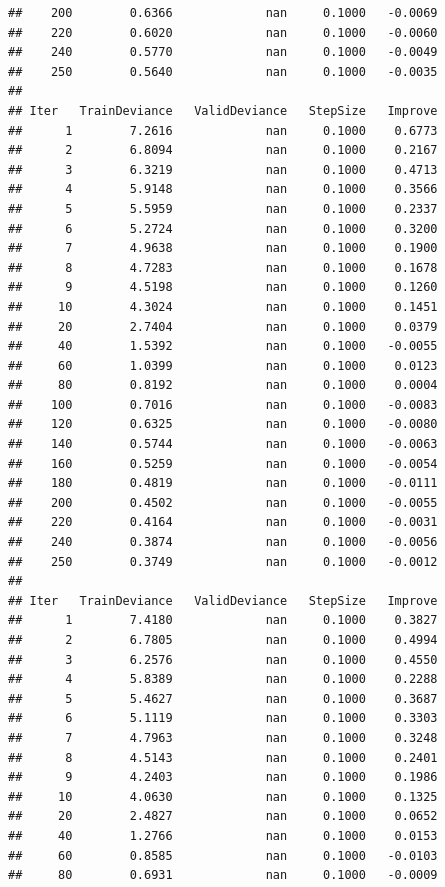 \documentclass[
]{book}
\begin{document}
\begin{verbatim}
##    200        0.6366             nan     0.1000   -0.0069
##    220        0.6020             nan     0.1000   -0.0060
##    240        0.5770             nan     0.1000   -0.0049
##    250        0.5640             nan     0.1000   -0.0035
## 
## Iter   TrainDeviance   ValidDeviance   StepSize   Improve
##      1        7.2616             nan     0.1000    0.6773
##      2        6.8094             nan     0.1000    0.2167
##      3        6.3219             nan     0.1000    0.4713
##      4        5.9148             nan     0.1000    0.3566
##      5        5.5959             nan     0.1000    0.2337
##      6        5.2724             nan     0.1000    0.3200
##      7        4.9638             nan     0.1000    0.1900
##      8        4.7283             nan     0.1000    0.1678
##      9        4.5198             nan     0.1000    0.1260
##     10        4.3024             nan     0.1000    0.1451
##     20        2.7404             nan     0.1000    0.0379
##     40        1.5392             nan     0.1000   -0.0055
##     60        1.0399             nan     0.1000    0.0123
##     80        0.8192             nan     0.1000    0.0004
##    100        0.7016             nan     0.1000   -0.0083
##    120        0.6325             nan     0.1000   -0.0080
##    140        0.5744             nan     0.1000   -0.0063
##    160        0.5259             nan     0.1000   -0.0054
##    180        0.4819             nan     0.1000   -0.0111
##    200        0.4502             nan     0.1000   -0.0055
##    220        0.4164             nan     0.1000   -0.0031
##    240        0.3874             nan     0.1000   -0.0056
##    250        0.3749             nan     0.1000   -0.0012
## 
## Iter   TrainDeviance   ValidDeviance   StepSize   Improve
##      1        7.4180             nan     0.1000    0.3827
##      2        6.7805             nan     0.1000    0.4994
##      3        6.2576             nan     0.1000    0.4550
##      4        5.8389             nan     0.1000    0.2288
##      5        5.4627             nan     0.1000    0.3687
##      6        5.1119             nan     0.1000    0.3303
##      7        4.7963             nan     0.1000    0.3248
##      8        4.5143             nan     0.1000    0.2401
##      9        4.2403             nan     0.1000    0.1986
##     10        4.0630             nan     0.1000    0.1325
##     20        2.4827             nan     0.1000    0.0652
##     40        1.2766             nan     0.1000    0.0153
##     60        0.8585             nan     0.1000   -0.0103
##     80        0.6931             nan     0.1000   -0.0009

\end{verbatim}
\end{document}
